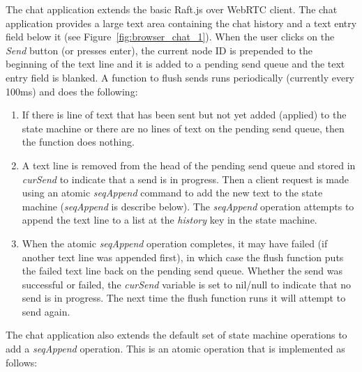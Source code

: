 \documentclass[9pt]{extarticle}
\begin{document}
\begin{multicols}{2}
The chat application extends the basic Raft.js over WebRTC client. The
chat application provides a large text area containing the chat
history and a text entry field below it
(see Figure~\ref{fig:browser_chat_1}). When the user clicks on the
\emph{Send} button (or presses enter), the current node ID is
prepended to the beginning of the text line and it is added to
a pending send queue and the text entry field is blanked. A function
to flush sends runs periodically (currently every 100ms) and does the
following:

\begin{enumerate}
\item If there is line of text that has been sent but not yet
    added (applied) to the state machine or there are no lines of text
    on the pending send queue, then the function does nothing.
\item A text line is removed from the head of the pending send queue
    and stored in \emph{curSend} to indicate that a send is in
    progress. Then a client request is made using an atomic
    \emph{seqAppend} command to add the new text to the state machine
    (\emph{seqAppend} is describe below).  The \emph{seqAppend}
    operation attempts to append the text line to a list at the
    \emph{history} key in the state machine.
\item When the atomic \emph{seqAppend} operation completes, it may
    have failed (if another text line was appended first), in which
    case the flush function puts the failed text line back on the
    pending send queue. Whether the send was successful or failed, the
    \emph{curSend} variable is set to nil/null to indicate that no
    send is in progress. The next time the flush function runs it will
    attempt to send again. %
\end{enumerate}


The chat application also extends the default set of state machine
operations to add a \emph{seqAppend} operation. This is an atomic
operation that is implemented as follows:


\end{multicols}
\end{document}
